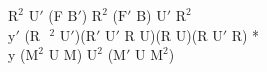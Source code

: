 $\text{R}^2$ $\text{U}'$ (F $\text{B}'$) $\text{R}^2$ ($\text{F}'$ B) $\text{U}'$ $\text{R}^2$\\
$\text{y}'$ (R$\text{ }^2$ $\text{U}'$)($\text{R}'$ $\text{U}'$ R U)(R U)(R $\text{U}'$ R) *\\
y ($\text{M}^2$ U M) $\text{U}^2$ ($\text{M}'$ U $\text{M}^2$)\\

